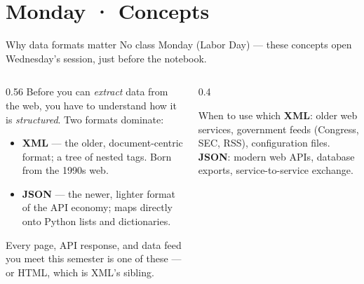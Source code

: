 \documentclass[9pt,aspectratio=169]{beamer}
\begin{document}
\section{Monday · Concepts}

\begin{frame}{Why data formats matter}
    {\small\textcolor{tab-gray}{No class Monday (Labor Day) --- these concepts open Wednesday's session, just before the notebook.}}

    \vspace{0.5em}

    \begin{columns}[T]
        \begin{column}{0.56\textwidth}
            Before you can \textit{extract} data from the web, you have to understand how it is \textit{structured}. Two formats dominate:

            \vspace{0.6em}
            \begin{itemize}\small
                \item \textbf{XML} --- the older, document-centric format; a tree of nested tags. Born from the 1990s web.
                \item \textbf{JSON} --- the newer, lighter format of the API economy; maps directly onto Python lists and dictionaries.
            \end{itemize}

            \vspace{0.6em}
            Every page, API response, and data feed you meet this semester is one of these --- or HTML, which is XML's sibling.
        \end{column}
        \begin{column}{0.4\textwidth}
            \begin{block}{When to use which}
                \footnotesize
                \textbf{XML}: older web services, government feeds (Congress, SEC, RSS), configuration files.\\[0.5em]
                \textbf{JSON}: modern web APIs, database exports, service-to-service exchange.
            \end{block}
        \end{column}
    \end{columns}
\end{frame}
\end{document}
